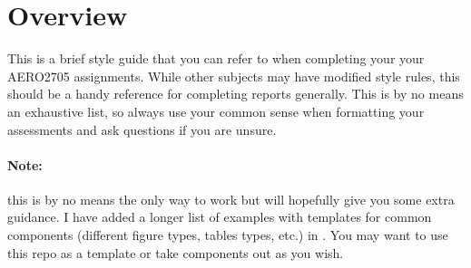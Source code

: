 \section{Overview}
This is a brief style guide that you can refer to when completing your your AERO2705 assignments. While other subjects may have modified style rules, this should be a handy reference for completing reports generally. This is by no means an exhaustive list, so always use your common sense when formatting your assessments and ask questions if you are unsure.

\paragraph{Note:} this is by no means the only way to work but will hopefully give you some extra guidance. I have added a longer list of examples with templates for common components (different figure types, tables types, etc.) in . You may want to use this repo as a template or take components out as you wish.